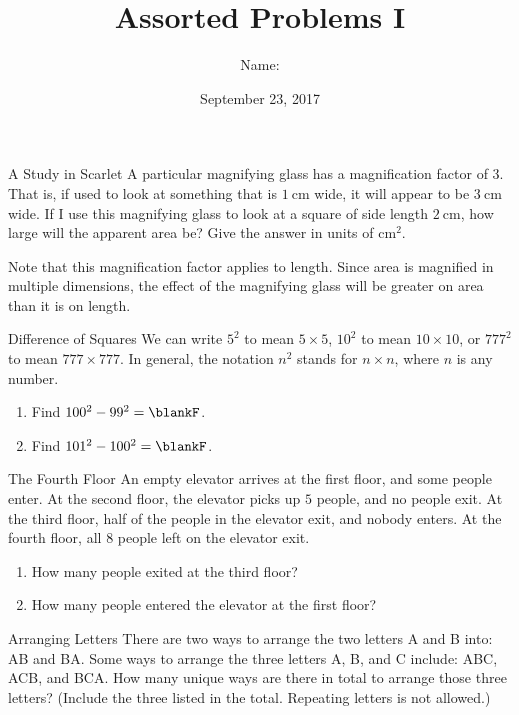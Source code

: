 \documentclass[14pt,letterpaper]{article}
\title{Assorted Problems I}
\author{Name: \underline{\hspace{5cm}}}
\date{September 23, 2017}
\begin{document}
\HomeworkTitle

\thispagestyle{empty}

\begin{problem}{A Study in Scarlet}
 A particular magnifying glass has a magnification factor of $3$. That is, if
 used to look at something that is $\SI{1}{\centi\metre}$ wide, it will appear
 to be $\SI{3}{\centi\metre}$ wide. If I use this magnifying glass to look at a
 square of side length $\SI{2}{\centi\metre}$, how large will the apparent area
 be? Give the answer in units of $\si{\centi\metre\squared}$.

 Note that this magnification factor applies to length. Since area is magnified
 in multiple dimensions, the effect of the magnifying glass will be greater on
 area than it is on length.
\end{problem}

\begin{problem}{Difference of Squares}
 We can write $5^2$ to mean $5\times5$, $10^2$ to mean $10\times10$, or $777^2$
 to mean $777\times777$. In general, the notation $n^2$ stands for $n\times n$,
 where $n$ is any number.

 \begin{enumerate}[\hspace{1cm}a.]
  \item Find $100^2 - 99^2 = \blankF$.
  \item Find $101^2 - 100^2 = \blankF$.
 \end{enumerate}
\end{problem}

\begin{problem}{The Fourth Floor}
 An empty elevator arrives at the first floor, and some people enter. At the
 second floor, the elevator picks up $5$ people, and no people exit. At the
 third floor, half of the people in the elevator exit, and nobody enters. At the
 fourth floor, all $8$ people left on the elevator exit.

 \begin{enumerate}[\hspace{1cm}a.]
  \item How many people exited at the third floor? \hfill \blankF
  \item How many people entered the elevator at the first floor? \hfill \blankF
 \end{enumerate}
\end{problem}

\begin{problem}{Arranging Letters}
 There are two ways to arrange the two letters A and B into: AB and BA. Some
 ways to arrange the three letters A, B, and C include: ABC, ACB, and BCA. How
 many unique ways are there in total to arrange those three letters? (Include
 the three listed in the total. Repeating letters is not allowed.)
\end{problem}
\end{document}
